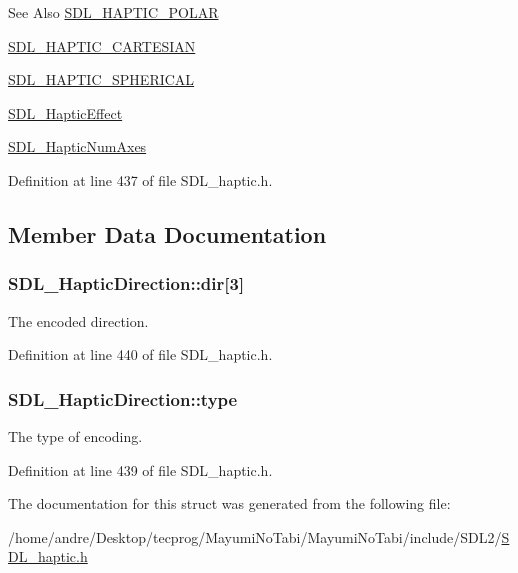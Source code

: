 \begin{DoxySeeAlso}{See Also}
\hyperlink{_s_d_l__haptic_8h_acdc35e97e5525472054a67b76e518f3b}{S\-D\-L\-\_\-\-H\-A\-P\-T\-I\-C\-\_\-\-P\-O\-L\-A\-R} 

\hyperlink{_s_d_l__haptic_8h_af8b2430a363a968de2a5b64c8f663d3b}{S\-D\-L\-\_\-\-H\-A\-P\-T\-I\-C\-\_\-\-C\-A\-R\-T\-E\-S\-I\-A\-N} 

\hyperlink{_s_d_l__haptic_8h_a1fcf7cb0eaf3c39b16ba266054e25aff}{S\-D\-L\-\_\-\-H\-A\-P\-T\-I\-C\-\_\-\-S\-P\-H\-E\-R\-I\-C\-A\-L} 

\hyperlink{union_s_d_l___haptic_effect}{S\-D\-L\-\_\-\-Haptic\-Effect} 

\hyperlink{_s_d_l__haptic_8h_ad6705645197f6df4eeeea32392462483}{S\-D\-L\-\_\-\-Haptic\-Num\-Axes} 
\end{DoxySeeAlso}


Definition at line 437 of file S\-D\-L\-\_\-haptic.\-h.



\subsection{Member Data Documentation}
\hypertarget{struct_s_d_l___haptic_direction_a6cebd8118a3e61e36bd0c503ae020362}{
\subsubsection[{dir}]{ S\-D\-L\-\_\-\-Haptic\-Direction\-::dir\mbox{[}3\mbox{]}}}\label{struct_s_d_l___haptic_direction_a6cebd8118a3e61e36bd0c503ae020362}
The encoded direction. 

Definition at line 440 of file S\-D\-L\-\_\-haptic.\-h.

\hypertarget{struct_s_d_l___haptic_direction_acd6830ad68c4ba2af16057fa418087cc}{
\subsubsection[{type}]{ S\-D\-L\-\_\-\-Haptic\-Direction\-::type}}\label{struct_s_d_l___haptic_direction_acd6830ad68c4ba2af16057fa418087cc}
The type of encoding. 

Definition at line 439 of file S\-D\-L\-\_\-haptic.\-h.



The documentation for this struct was generated from the following file\-:\begin{DoxyCompactItemize}
\item 
/home/andre/\-Desktop/tecprog/\-Mayumi\-No\-Tabi/\-Mayumi\-No\-Tabi/include/\-S\-D\-L2/\hyperlink{_s_d_l__haptic_8h}{S\-D\-L\-\_\-haptic.\-h}\end{DoxyCompactItemize}
